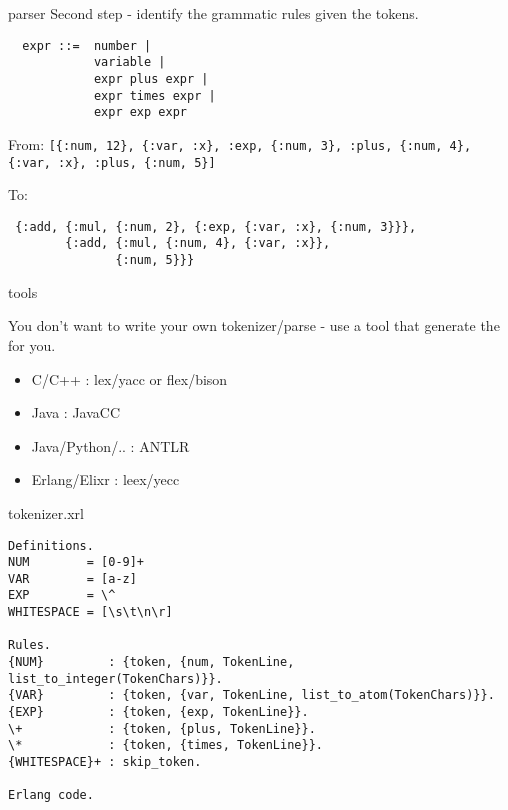\begin{frame}[fragile]{parser}
  \pause
   Second step - identify the grammatic rules given the tokens.

  \pause 
\begin{verbatim}
  expr ::=  number |
            variable |
            expr plus expr |
            expr times expr |
            expr exp expr
\end{verbatim}

\pause\vspace{10pt}
  From: {\tt [\{:num, 12\}, \{:var, :x\}, :exp, \{:num, 3\}, :plus, \{:num, 4\}, \{:var, :x\}, :plus, \{:num, 5\}]}
\pause\vspace{20pt}  

To:
\begin{verbatim}
 {:add, {:mul, {:num, 2}, {:exp, {:var, :x}, {:num, 3}}}, 
        {:add, {:mul, {:num, 4}, {:var, :x}}, 
               {:num, 5}}}
\end{verbatim}
\end{frame}


\begin{frame}{tools}

  You don't want to write your own tokenizer/parse - use a tool that generate the for you. \pause
  
  \begin{itemize}
  \item C/C++ : lex/yacc or flex/bison
  \item Java : JavaCC
  \item Java/Python/.. : ANTLR
  \item Erlang/Elixr : leex/yecc
  \end{itemize}

\end{frame}

\begin{frame}[fragile]{tokenizer.xrl}

\begin{verbatim}
Definitions.
NUM        = [0-9]+
VAR        = [a-z]
EXP        = \^
WHITESPACE = [\s\t\n\r]

Rules.
{NUM}         : {token, {num, TokenLine, list_to_integer(TokenChars)}}.
{VAR}         : {token, {var, TokenLine, list_to_atom(TokenChars)}}.
{EXP}         : {token, {exp, TokenLine}}.
\+            : {token, {plus, TokenLine}}.
\*            : {token, {times, TokenLine}}.
{WHITESPACE}+ : skip_token.

Erlang code.
\end{verbatim}
\end{frame}

